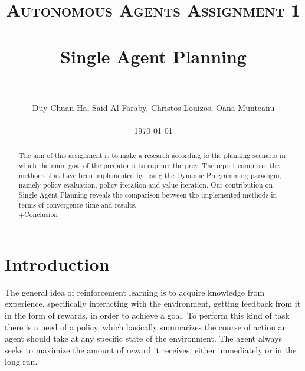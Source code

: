 \documentclass[paper=a4, fontsize=11pt]{scrartcl}
\title{
		\usefont{OT1}{bch}{b}{n}
		\normalfont \normalsize \textsc{Autonomous Agents Assignment 1} \\ [25pt]
		\horrule{0.5pt} \\[0.4cm]
		\huge Single Agent Planning \\
		\horrule{2pt} \\[0.5cm]
}
\author{
        Duy Chuan Ha, Said Al Faraby, Christos Louizos, Oana Munteanu %
        \\
        \\
        \today
}
\date{}
\numberwithin{equation}{section}		%
\numberwithin{figure}{section}			%
\numberwithin{table}{section}				%
\begin{document}
\maketitle
\bigskip
\bigskip
\bigskip
\bigskip
\begin{abstract}
The aim of this assignment is to make a research according to the planning scenario in which the main goal of the predator is to capture the prey. The report comprises the methods that have been implemented by using the Dynamic Programming paradigm, namely policy evaluation, policy iteration and value iteration. Our contribution on Single Agent Planning reveals the comparison between the implemented methods in terms of convergence time and results. \\ +Conclusion
\end{abstract}

\section{Introduction}
The general idea of reinforcement learning is to acquire knowledge from experience, specifically interacting with the environment, getting feedback from it in the form of rewards, in order to achieve a goal. To perform this kind of task there is a need of a policy, which basically summarizes the course of action an agent should take at any specific state of the environment. The agent always seeks to maximize the amount of reward it receives, either immediately or in the long run. 
\end{document}

